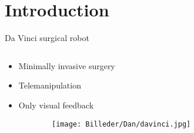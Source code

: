 \section{Introduction}


\begin{frame}{Da Vinci surgical robot}{}

\begin{columns}[T]
\begin{column}{1\textwidth}

  \begin{itemize}
    \item<1-> Minimally invasive surgery
    \vspace{0.3cm}
    \item<2-> Telemanipulation  
    \vspace{0.3cm}
    \item<3-> Only visual feedback  
  \end{itemize}
  
  \begin{figure}[H]
  	\centering
  	  \begin{subfigure}{0.6\textwidth}
  		\centering
  		\texttt{[image: Billeder/Dan/davinci.jpg]}
  	\end{subfigure}
  
  	
  	
  \end{figure}
\end{column}%

\end{columns}


\end{frame}




